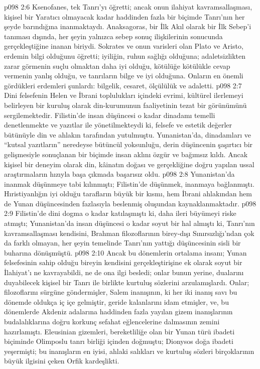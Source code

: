 \vs p098 2:6 Ksenofanes, tek Tanrı’yı öğretti; ancak onun ilahiyat kavramsallaşması, kişisel bir Yaratıcı olmayacak kadar haddinden fazla bir biçimde Tanrı’nın her şeyde barındığına inanmaktaydı. Anaksagoras, bir İlk Akıl olarak bir İlk Sebep’i tanıması dışında, her şeyin yalnızca sebep sonuç ilişkilerinin sonucunda gerçekleştiğine inanan biriydi. Sokrates ve onun varisleri olan Plato ve Aristo, erdemin bilgi olduğunu öğretti; iyiliğin, ruhun sağlığı olduğuna; adaletsizlikten zarar görmenin suçlu olmaktan daha iyi olduğu, kötülüğe kötülükle cevap vermenin yanlış olduğu, ve tanrıların bilge ve iyi olduğuna. Onların en önemli gördükleri erdemleri şunlardı: bilgelik, cesaret, ölçülülük ve adaletti.
\vs p098 2:7 Dini felsefenin Helen ve İbrani toplulukları içindeki evrimi, kültürel ilerlemeyi belirleyen bir kuruluş olarak din\hyp{}kurumunun faaliyetinin tezat bir görünümünü sergilemektedir. Filistin’de insan düşüncesi o kadar dinadamı temelli denetlenmekte ve yazıtlar ile yönetilmekteydi ki, felsefe ve estetik değerler bütünüyle din ve ahlakın tarafından yutulmuştu. Yunanistan’da, dinadamları ve “kutsal yazıtların” neredeyse bütüncül yoksunluğu, derin düşüncenin şaşırtıcı bir gelişmesiyle sonuçlanan bir biçimde insan aklını özgür ve bağımsız kıldı. Ancak kişisel bir deneyim olarak din, kâinatın doğası ve gerçekliğine doğru yapılan ussal araştırmaların hızıyla başa çıkmada başarısız oldu.
\vs p098 2:8 Yunanistan’da inanmak düşünmeye tabi kılınmıştı; Filistin’de düşünmek, inanmaya bağlanmıştı. Hıristiyanlığın iyi olduğu tarafların büyük bir kısmı, hem İbrani ahlakından hem de Yunan düşüncesinden fazlasıyla beslenmiş oluşundan kaynaklanmaktadır.
\vs p098 2:9 Filistin’de dini dogma o kadar katılaşmıştı ki, daha ileri büyümeyi riske atmıştı; Yunanistan’da insan düşüncesi o kadar soyut bir hal almıştı ki, Tanrı’nın kavramsallaşması kendisini, Brahman filozoflarının birey\hyp{}dışı Sınırsızlığı’ndan çok da farklı olmayan, her şeyin temelinde Tanrı’nın yattığı düşüncesinin sisli bir buharına dönüşmüştü.
\vs p098 2:10 Ancak bu dönemlerin ortalama insanı; Yunan felsefesinin sahip olduğu bireyin kendisini gerçekleştirişine ek olarak soyut bir İlahiyat’ı ne kavrayabildi, ne de ona ilgi besledi; onlar bunun yerine, dualarını duyabilecek kişisel bir Tanrı ile birlikte kurtuluş sözlerini arzulamışlardı. Onlar; filozoflarını sürgüne göndermişler, Salem inanışının, ki her iki inanış savı bu dönemde oldukça iç içe gelmiştir, geride kalanlarını idam etmişler, ve, bu dönemlerde Akdeniz adalarına haddinden fazla yayılan gizem inanışlarının budalalıklarına doğru korkunç sefahat eğlencelerine dalmasının zemini hazırlamıştı. Eleusinian gizemleri, bereketliliğe olan bir Yunan türü ibadeti biçiminde Olimposlu tanrı birliği içinden doğmuştu; Dionysos doğa ibadeti yeşermişti; bu inanışların en iyisi, ahlaki salıkları ve kurtuluş sözleri birçoklarının büyük ilgisini çeken Orfik kardeşlikti.
